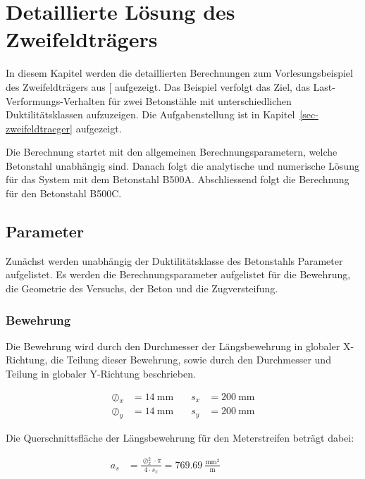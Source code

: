 \documentclass[
  11pt,
  letterpaper,
]{scrreprt}
\begin{document}
\cleardoublepage
{}
{}
\appendix

\chapter{Detaillierte Lösung des
Zweifeldträgers}\label{sec-zweifeldtraeger_anhang}

In diesem Kapitel werden die detaillierten Berechnungen zum
Vorlesungsbeispiel des Zweifeldträgers aus
{[}\citeproc{ref-jager_stahlbeton_2009}{3}{]} aufgezeigt. Das Beispiel
verfolgt das Ziel, das Last-Verformungs-Verhalten für zwei Betonstähle
mit unterschiedlichen Duktilitätsklassen aufzuzeigen. Die
Aufgabenstellung ist in Kapitel~\ref{sec-zweifeldtraeger} aufgezeigt.

Die Berechnung startet mit den allgemeinen Berechnungsparametern, welche
Betonstahl unabhängig sind. Danach folgt die analytische und numerische
Lösung für das System mit dem Betonstahl B500A. Abschliessend folgt die
Berechnung für den Betonstahl B500C.

\section{Parameter}\label{parameter}

Zunächst werden unabhängig der Duktilitätsklasse des Betonstahls
Parameter aufgelistet. Es werden die Berechnungsparameter aufgelistet
für die Bewehrung, die Geometrie des Versuchs, der Beton und die
Zugversteifung.

\subsection{Bewehrung}\label{bewehrung}

Die Bewehrung wird durch den Durchmesser der Längsbewehrung in globaler
X-Richtung, die Teilung dieser Bewehrung, sowie durch den Durchmesser
und Teilung in globaler Y-Richtung beschrieben.

\[
\begin{aligned}
\oslash_{x}& = 14 \ \mathrm{mm} \quad & s_{x}& = 200 \ \mathrm{mm} \\ 
\oslash_{y}& = 14 \ \mathrm{mm} \quad & s_{y}& = 200 \ \mathrm{mm} \end{aligned}
\]

Die Querschnittsfläche der Längsbewehrung für den Meterstreifen beträgt
dabei:

\[
\begin{aligned}
a_{s}& = \frac{\oslash_{x}^{2} \cdot \pi}{4 \cdot s_{x}} = 769.69 \ \frac{\mathrm{mm}^{2}}{\mathrm{m}} \quad &  \quad &  
 \end{aligned}
\]
\end{document}
